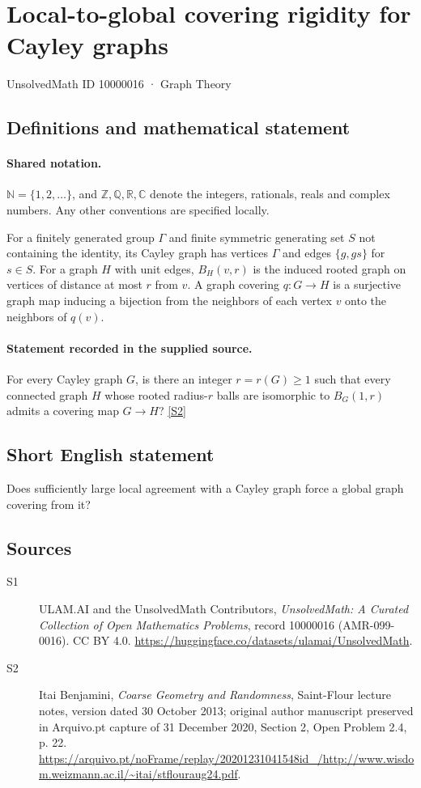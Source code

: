 \documentclass[11pt]{article}
\newcommand{\sref}[2]{\hyperlink{source:#1:#2}{[S#2]}}
\begin{document}
\setcounter{section}{10000015}
\section{Local-to-global covering rigidity for Cayley graphs}\label{10000016}
{\small\sffamily UnsolvedMath ID 10000016 · Graph Theory}
\subsection{Definitions and mathematical statement}

\paragraph{Shared notation.}$\mathbb N=\{1,2,\ldots\}$, and $\mathbb Z,\mathbb Q,\mathbb R,\mathbb C$ denote the integers, rationals, reals and complex numbers. Any other conventions are specified locally.


For a finitely generated group $\Gamma$ and finite symmetric generating set $S$ not containing the identity, its Cayley graph has vertices $\Gamma$ and edges $\{g,gs\}$ for $s\in S$. For a graph $H$ with unit edges, $B_H(v,r)$ is the induced rooted graph on vertices of distance at most $r$ from $v$. A graph covering $q:G\to H$ is a surjective graph map inducing a bijection from the neighbors of each vertex $v$ onto the neighbors of $q(v)$.
\paragraph{Statement recorded in the supplied source.}
For every Cayley graph $G$, is there an integer $r=r(G)\ge1$ such that every connected graph $H$ whose rooted radius-$r$ balls are isomorphic to $B_G(1,r)$ admits a covering map $G\to H$? \sref{10000016}{2}
\subsection{Short English statement}
Does sufficiently large local agreement with a Cayley graph force a global graph covering from it?
\subsection{Sources}
\begin{description}
\item[\hypertarget{source:10000016:1}{S1}] ULAM.AI and the UnsolvedMath Contributors, \emph{UnsolvedMath: A Curated Collection of Open Mathematics Problems}, record 10000016 (AMR-099-0016). CC BY 4.0. \url{https://huggingface.co/datasets/ulamai/UnsolvedMath}.
\item[\hypertarget{source:10000016:2}{S2}] Itai Benjamini, \emph{Coarse Geometry and Randomness}, Saint-Flour lecture notes, version dated 30 October 2013; original author manuscript preserved in Arquivo.pt capture of 31 December 2020, Section 2, Open Problem 2.4, p. 22. \url{https://arquivo.pt/noFrame/replay/20201231041548id_/http://www.wisdom.weizmann.ac.il/~itai/stflouraug24.pdf}.
\end{description}
\label{end:10000016}
\end{document}

